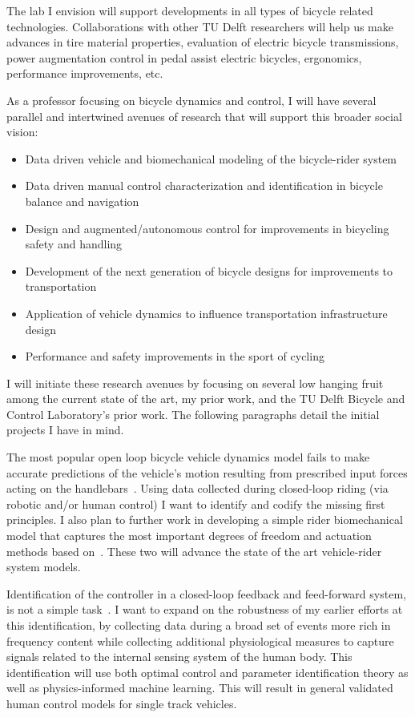 \documentclass{article}
\begin{document}
The lab I envision will support developments in all types of bicycle related
technologies. Collaborations with other TU Delft researchers will help us make
advances in tire material properties, evaluation of electric bicycle
transmissions, power augmentation control in pedal assist electric bicycles,
ergonomics, performance improvements, etc.

As a professor focusing on bicycle dynamics and control, I will have several
parallel and intertwined avenues of research that will support this broader
social vision:
%
\begin{itemize}
  \item Data driven vehicle and biomechanical modeling of the bicycle-rider
    system
  \item Data driven manual control characterization and identification in
    bicycle balance and navigation
  \item Design and augmented/autonomous control for improvements in bicycling
    safety and handling
  \item Development of the next generation of bicycle designs for improvements
    to transportation
  \item Application of vehicle dynamics to influence transportation
    infrastructure design
  \item Performance and safety improvements in the sport of cycling
\end{itemize}

I will initiate these research avenues by focusing on several low hanging fruit
among the current state of the art, my prior work, and the TU Delft Bicycle and
Control Laboratory's prior work. The following paragraphs detail the initial
projects I have in mind.

The most popular open loop bicycle vehicle dynamics model fails to make
accurate predictions of the vehicle's motion resulting from prescribed input
forces acting on the handlebars~\cite{Moore2013a}. Using data collected during
closed-loop riding (via robotic and/or human control) I want to identify and
codify the missing first principles. I also plan to further work in developing
a simple rider biomechanical model that captures the most important degrees of
freedom and actuation methods based on~\cite{Moore2011}. These two will advance
the state of the art vehicle-rider system models.

Identification of the controller in a closed-loop feedback and feed-forward
system, is not a simple task~\cite{vanderKooij2005}. I want to expand on the
robustness of my earlier efforts at this identification, by collecting data
during a broad set of events more rich in frequency content while collecting
additional physiological measures to capture signals related to the internal
sensing system of the human body. This identification will use both optimal
control and parameter identification theory as well as physics-informed machine
learning. This will result in general validated human control models for single
track vehicles.
\end{document}
